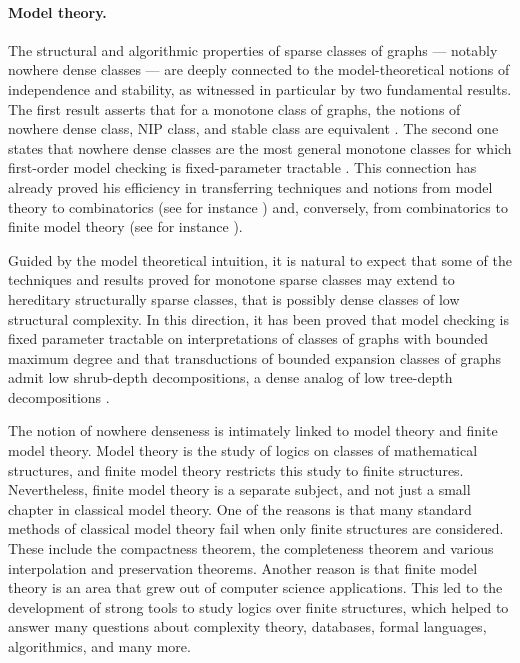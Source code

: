 \paragraph*{Model theory.}
The  structural and algorithmic properties of sparse classes of graphs --- notably nowhere dense classes --- are deeply connected to  the model-theoretical notions of independence and stability, as witnessed in particular by two fundamental results. The first result asserts that for a monotone class of graphs, the notions of nowhere dense class, NIP class, and stable class are equivalent \cite{adler2014interpreting}. The second one states that nowhere dense classes are the most general monotone classes for which first-order model checking is fixed-parameter tractable \cite{grohe2017deciding}. This connection has already proved his efficiency in transferring techniques and notions from model theory to combinatorics (see for instance \cite{pilipczuk2018number}) and, conversely, from combinatorics to finite model theory (see for instance \cite{rossman2008homomorphism}).

Guided by the model theoretical intuition, it is natural to expect that some of the techniques and results proved for monotone sparse classes may extend to hereditary structurally sparse classes, that is possibly dense classes of low structural complexity. In this direction, it has been proved that model checking is fixed parameter tractable on interpretations of classes of graphs with bounded maximum degree \cite{gajarsky2016new} and that transductions of bounded expansion classes of graphs admit low shrub-depth decompositions, a dense analog of low tree-depth decompositions \cite{gajarsky2018first}. 

The notion of nowhere denseness is intimately linked to 
model theory and finite model theory. 
Model theory is the study of logics on classes of 
mathematical structures, and finite model theory restricts this
study to finite structures. Nevertheless, finite model theory is
a separate subject, and not just a small chapter in classical
model theory. One of the reasons is that many standard 
methods of classical model theory fail when only finite structures 
are considered. These include the compactness theorem, the 
completeness theorem and various interpolation and preservation
theorems. Another reason is that finite model theory is an area 
that grew out of computer science applications. This led to
the development of strong tools to study logics over finite 
structures, which helped to answer many questions about 
complexity theory, databases, formal languages, algorithmics,
and many more. 

